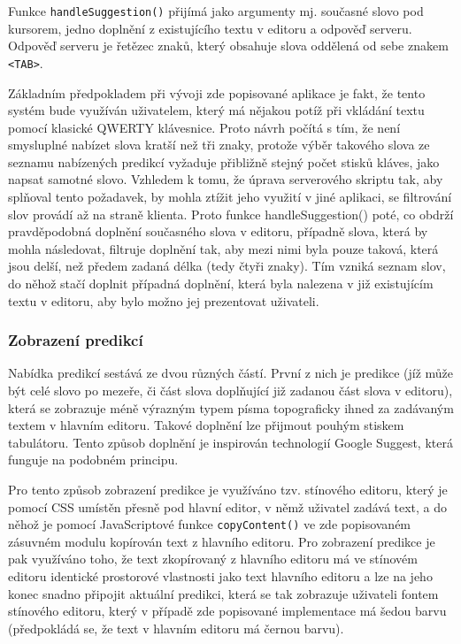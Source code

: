 \documentclass{article}
\begin{document}
Funkce {\tt handleSuggestion()} přijímá jako argumenty mj. současné slovo pod kursorem, jedno doplnění z existujícího textu v editoru a odpověď serveru. Odpověď serveru je řetězec znaků, který obsahuje slova oddělená od sebe znakem {\tt <TAB>}. 

Základním předpokladem při vývoji zde popisované aplikace je fakt, že tento systém bude využíván uživatelem, který má nějakou potíž při vkládání textu pomocí klasické QWERTY klávesnice. Proto návrh počítá s tím, že není smysluplné nabízet slova kratší než tři znaky, protože výběr takového slova ze seznamu nabízených predikcí vyžaduje přibližně stejný počet stisků kláves, jako napsat samotné slovo. Vzhledem k tomu, že úprava serverového skriptu tak, aby splňoval tento požadavek, by mohla ztížit jeho využití v jiné aplikaci, se filtrování slov provádí až na straně klienta. Proto funkce handleSuggestion() poté, co obdrží pravděpodobná doplnění současného slova v editoru, případně slova, která by mohla následovat, filtruje doplnění tak, aby mezi nimi byla pouze taková, která jsou delší, než předem zadaná délka (tedy čtyři znaky). Tím vzniká seznam slov, do něhož stačí doplnit případná doplnění, která byla nalezena v již existujícím textu v editoru, aby bylo možno jej prezentovat uživateli.

\subsubsection{Zobrazení predikcí}

Nabídka predikcí sestává ze dvou různých částí. První z nich je predikce (jíž může být celé slovo po mezeře, či část slova doplňující již zadanou část slova v editoru), která se zobrazuje méně výrazným typem písma topograficky ihned za zadávaným textem v hlavním editoru. Takové doplnění lze přijmout pouhým stiskem tabulátoru. Tento způsob doplnění je inspirován technologií Google Suggest, která funguje na podobném principu. 

Pro tento způsob zobrazení predikce je využíváno tzv. stínového editoru, který je pomocí CSS umístěn přesně pod hlavní editor, v němž uživatel zadává text, a do něhož je pomocí JavaScriptové funkce {\tt copyContent()} ve zde popisovaném zásuvném modulu kopírován text z hlavního editoru. Pro zobrazení predikce je pak využíváno toho, že text zkopírovaný z hlavního editoru má ve stínovém editoru identické prostorové vlastnosti jako text hlavního editoru a lze na jeho konec snadno připojit aktuální predikci, která se tak zobrazuje uživateli fontem stínového editoru, který v případě zde popisované implementace má šedou barvu (předpokládá se, že text v hlavním editoru má černou barvu). 
\end{document}
